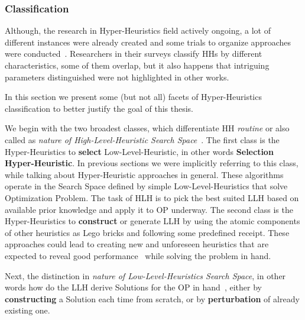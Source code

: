 \subsubsection{Classification}
Although, the research in Hyper-Heuristics field actively ongoing, a lot of different instances were already created and some trials to organize approaches were conducted~\cite{ryser2014review,drake2019recent,burke2019classification}.
Researchers in their surveys classify HHs by different characteristics, some of them overlap, but it also happens that intriguing parameters distinguished were not highlighted in other works. 

In this section we present some (but not all) facets of Hyper-Heuristics classification to better justify the goal of this thesis.


We begin with the two broadest classes, which differentiate HH \textit{routine} or also called as \textit{nature of High-Level-Heuristic Search Space}~\cite{burke2013hyper,burke2019classification,drake2019recent}.
The first class is the Hyper-Heuristics to \textbf{select} Low-Level-Heuristic, in other words \textbf{Selection Hyper-Heuristic}. In previous sections we were implicitly referring to this class, while talking about Hyper-Heuristic approaches in general. These algorithms operate in the Search Space defined by simple Low-Level-Heuristics that solve Optimization Problem. The task of HLH is to pick the best suited LLH based on available prior knowledge and apply it to OP underway.
The second class is the Hyper-Heuristics to \textbf{construct} or generate LLH by using the atomic components of other heuristics as Lego bricks and following some predefined receipt. These approaches could lead to creating new and unforeseen heuristics that are expected to reveal good performance~\cite{burke2019classification} while solving the problem in hand.


Next, the distinction in \textit{nature of Low-Level-Heuristics Search Space}, in other words how do the LLH derive Solutions for the OP in hand~\cite{burke2013hyper,burke2019classification,drake2019recent}, either by \textbf{constructing} a Solution each time from scratch, or by \textbf{perturbation} of already existing one.


